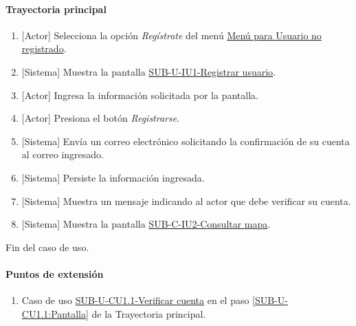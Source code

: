 \paragraph{Trayectoria principal}
	\begin{enumerate}
		\item {[Actor]} Selecciona la opción \textit{Regístrate} del menú \hyperref[fig:menu-usuario]{Menú para Usuario no registrado}.
		\item {[Sistema]} Muestra la pantalla \hyperref[fig:sub-u-iu1]{SUB-U-IU1-Registrar usuario}.
		\item {[Actor]} Ingresa la información solicitada por la pantalla.
		\item {[Actor]} Presiona el botón \textit{Registrarse}.
		\item {[Sistema]} Envía un correo electrónico solicitando la confirmación de su cuenta al correo ingresado.
		\item {[Sistema]} Persiste la información ingresada.
		\item {[Sistema]} Muestra un mensaje indicando al actor que debe verificar su cuenta.
		\item \label{SUB-U-CU1:Pantalla} {[Sistema]} Muestra la pantalla \hyperref[fig:sub-c-iu2]{SUB-C-IU2-Consultar mapa}.
	\end{enumerate}
	Fin del caso de uso.


\paragraph{Puntos de extensión} \label{SUB-M-CU1.1:P}
\begin{enumerate}[label=PE\arabic*.]
	\item Caso de uso \hyperref[SUB-U-CU1.1]{SUB-U-CU1.1-Verificar cuenta} en el paso \ref{SUB-U-CU1.1:Pantalla} de la Trayectoria principal.
\end{enumerate}
